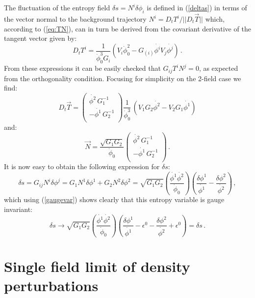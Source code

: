 \documentclass[a4paper,11pt]{article}
\def\be{\begin{equation}}
\def\ee{\end{equation}}
\begin{document}
The fluctuation of the entropy field $\delta s=N^i\delta\phi_i$ is defined in (\ref{deltas}) in terms of the vector normal to the background trajectory $N^i= D_t T^i / || D_t \vec{T}||$ which, according to (\ref{eq:TN}), can in turn be derived from the covariant derivative of the tangent vector given by: 
\be
D_t T^i=\frac{1}{\dot{\phi}_0^3 G_i} \left(V_i \dot{\phi}_0^2 - G_{(i)} \dot{\phi^i} V_j \dot{\phi^j} \right)\,.
\ee
From these expressions it can be easily checked that $G_{ij} T^i N^j =0$, as expected from the orthogonality condition. Focusing for simplicity on the 2-field case we find:
\be
D_t \vec{T} = \begin{pmatrix}
\dot{\phi^2}\,G_1^{-1}\\
 -  \dot{\phi^1}\,G_2^{-1} \\
\end{pmatrix}
 \frac{1}{\dot{\phi}_0^3}\,\left(V_1 G_2 \dot{\phi^2} - V_2 G_1 \dot{\phi^1}\right)
\ee
and:
\be
\vec{N}= \frac{\sqrt{G_1 G_2}}{\dot{\phi}_0}
\begin{pmatrix}
\dot{\phi^2}\,G_1^{-1}\\
 -  \dot{\phi^1}\,G_2^{-1} \\
\end{pmatrix}\,.
\ee
It is now easy to obtain the following expression for $\delta s$:
\be
\delta s = G_{ij} N^i \delta \phi^j= G_1 N^1 \delta \phi^1 +G_2 N^2 \delta \phi^2= \sqrt{G_1 G_2} \left(\frac{\dot{\phi^1} \dot{\phi^2}}{\dot\phi_0}\right) \left( \frac{\delta \phi^1}{\dot{\phi^1}} - \frac{\delta \phi^2}{\dot{\phi^2}} \right) \,,
\ee
which using (\ref{gaugevar}) shows clearly that this entropy variable is gauge invariant:
\be
\delta s \to  
\sqrt{G_1 G_2} \left(\frac{\dot{\phi^1} \dot{\phi^2}}{\dot\phi_0}\right) \left( \frac{\delta \phi^1}{\dot{\phi^1}}-\epsilon^0 - \frac{\delta \phi^2}{\dot{\phi^2}} +\epsilon^0\right) =\delta s \,.
\ee


\section{Single field limit of density perturbations}
\label{sec:singlefield}
\end{document}
